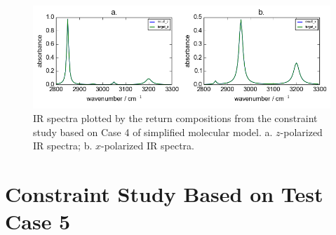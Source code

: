 \begin{figure}[!ht] 
\centering
\includegraphics[scale=0.7]{Figures/toy_model_result_plotting_ir_sin_4candi_constraint_study_experiment4.png} 
\caption{IR spectra plotted by the return compositions from the constraint study based on Case 4 of simplified molecular model. a. $z$-polarized IR spectra; b. $x$-polarized IR spectra.}\label{fig:3.5}
\end{figure}


\section{Constraint Study Based on Test Case 5}

